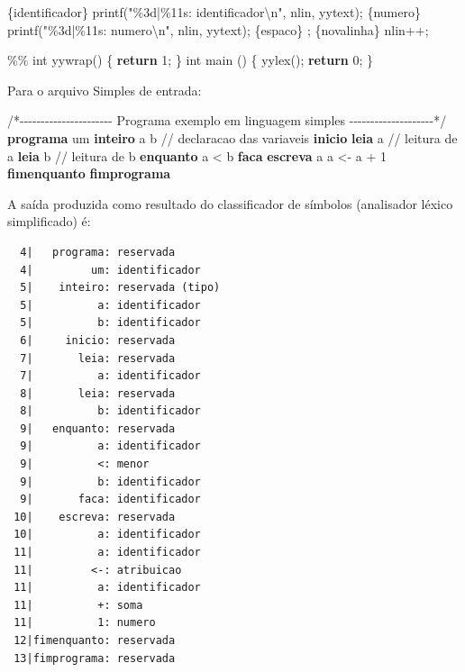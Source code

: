 \documentclass[
  brazilian,
  letterpaper,
]{book}
\newenvironment{Shaded}{\begin{snugshade}}{\end{snugshade}}
\newcommand{\CommentTok}[1]{\textcolor[rgb]{0.37,0.37,0.37}{#1}}
\newcommand{\ControlFlowTok}[1]{\textcolor[rgb]{0.00,0.23,0.31}{\textbf{#1}}}
\newcommand{\DataTypeTok}[1]{\textcolor[rgb]{0.68,0.00,0.00}{#1}}
\newcommand{\DecValTok}[1]{\textcolor[rgb]{0.68,0.00,0.00}{#1}}
\newcommand{\KeywordTok}[1]{\textcolor[rgb]{0.00,0.23,0.31}{\textbf{#1}}}
\newcommand{\NormalTok}[1]{\textcolor[rgb]{0.00,0.23,0.31}{#1}}
\newcommand{\OperatorTok}[1]{\textcolor[rgb]{0.37,0.37,0.37}{#1}}
\newcommand{\SpecialCharTok}[1]{\textcolor[rgb]{0.37,0.37,0.37}{#1}}
\newcommand{\StringTok}[1]{\textcolor[rgb]{0.13,0.47,0.30}{#1}}
\theoremstyle{plain}
\theoremstyle{definition}
\theoremstyle{remark}
\begin{document}
\begin{Shaded}
\begin{Highlighting}[]
\OperatorTok{\{}\NormalTok{identificador}\OperatorTok{\}}\NormalTok{   printf}\OperatorTok{(}\StringTok{"}\SpecialCharTok{\%3d}\StringTok{|}\SpecialCharTok{\%11s}\StringTok{: identificador}\SpecialCharTok{\textbackslash{}n}\StringTok{"}\OperatorTok{,}\NormalTok{ nlin}\OperatorTok{,}\NormalTok{ yytext}\OperatorTok{);}
\OperatorTok{\{}\NormalTok{numero}\OperatorTok{\}}\NormalTok{          printf}\OperatorTok{(}\StringTok{"}\SpecialCharTok{\%3d}\StringTok{|}\SpecialCharTok{\%11s}\StringTok{: numero}\SpecialCharTok{\textbackslash{}n}\StringTok{"}\OperatorTok{,}\NormalTok{ nlin}\OperatorTok{,}\NormalTok{ yytext}\OperatorTok{);}
\OperatorTok{\{}\NormalTok{espaco}\OperatorTok{\}}          \OperatorTok{;}
\OperatorTok{\{}\NormalTok{novalinha}\OperatorTok{\}}\NormalTok{       nlin}\OperatorTok{++;}

\OperatorTok{\%\%}
\DataTypeTok{int}\NormalTok{ yywrap}\OperatorTok{()} \OperatorTok{\{} \ControlFlowTok{return} \DecValTok{1}\OperatorTok{;} \OperatorTok{\}}
\DataTypeTok{int}\NormalTok{ main }\OperatorTok{()} \OperatorTok{\{}
\NormalTok{    yylex}\OperatorTok{();}
    \ControlFlowTok{return} \DecValTok{0}\OperatorTok{;}
\OperatorTok{\}}
\end{Highlighting}
\end{Shaded}

Para o arquivo Simples de entrada:

\begin{Shaded}
\begin{Highlighting}[]
\NormalTok{/*{-}{-}{-}{-}{-}{-}{-}{-}{-}{-}{-}{-}{-}{-}{-}{-}{-}{-}{-}{-}{-}{-}}
\NormalTok{Programa exemplo em linguagem simples}
\NormalTok{{-}{-}{-}{-}{-}{-}{-}{-}{-}{-}{-}{-}{-}{-}{-}{-}{-}{-}{-}{-}*/}
\KeywordTok{programa}\NormalTok{ um}
  \KeywordTok{inteiro}\NormalTok{ a b  }\CommentTok{// declaracao das variaveis}
\KeywordTok{inicio}
  \KeywordTok{leia}\NormalTok{ a  }\CommentTok{// leitura de a}
  \KeywordTok{leia}\NormalTok{ b  }\CommentTok{// leitura de b}
  \KeywordTok{enquanto}\NormalTok{ a \textless{} b }\KeywordTok{faca}
     \KeywordTok{escreva}\NormalTok{ a }
\NormalTok{     a \textless{}{-} a + }\DecValTok{1}
  \KeywordTok{fimenquanto}
\KeywordTok{fimprograma}
\end{Highlighting}
\end{Shaded}

A saída produzida como resultado do classificador de símbolos
(analisador léxico simplificado) é:

\begin{verbatim}
  4|   programa: reservada
  4|         um: identificador
  5|    inteiro: reservada (tipo)
  5|          a: identificador
  5|          b: identificador
  6|     inicio: reservada
  7|       leia: reservada
  7|          a: identificador
  8|       leia: reservada
  8|          b: identificador
  9|   enquanto: reservada
  9|          a: identificador
  9|          <: menor
  9|          b: identificador
  9|       faca: identificador
 10|    escreva: reservada
 10|          a: identificador
 11|          a: identificador
 11|         <-: atribuicao
 11|          a: identificador
 11|          +: soma
 11|          1: numero
 12|fimenquanto: reservada
 13|fimprograma: reservada
\end{verbatim}
\end{document}
